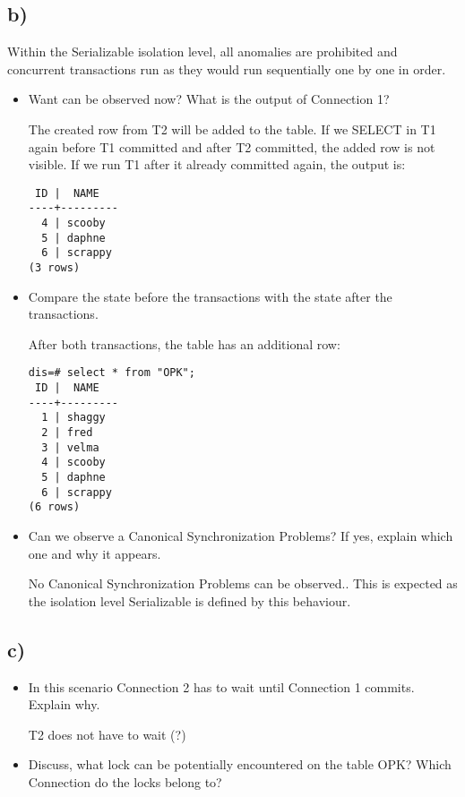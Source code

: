 \documentclass[ngerman]{dis-template-add}
\begin{document}
\subsection*{b)}

Within the Serializable isolation level, all anomalies are prohibited and concurrent transactions run as they would run sequentially one by one in order.


\begin{itemize}
\item Want can be observed now? What is the output of Connection 1?

The created row from T2 will be added to the table.
If we SELECT in T1 again before T1 committed and after T2 committed, the added row is not visible.
If we run T1 after it already committed again, the output is:

\begin{verbatim}
 ID |  NAME   
----+---------
  4 | scooby
  5 | daphne
  6 | scrappy
(3 rows)
\end{verbatim}

\item Compare the state before the transactions with the state after the transactions.

After both transactions, the table has an additional row:

\begin{verbatim}
dis=# select * from "OPK";
 ID |  NAME   
----+---------
  1 | shaggy
  2 | fred
  3 | velma
  4 | scooby
  5 | daphne
  6 | scrappy
(6 rows)
\end{verbatim}

\item Can we observe a Canonical Synchronization Problems? If yes, explain which one and why it appears.

No Canonical Synchronization Problems can be observed.. This is expected as the isolation level Serializable is defined by this behaviour.

\end{itemize}

\subsection*{c)}

\begin{itemize}
\item In this scenario Connection 2 has to wait until Connection 1 commits. Explain why.

T2 does not have to wait (?)

\item Discuss, what lock can be potentially encountered on the table OPK? Which Connection do the locks belong to?

\end{itemize}
\end{document}
